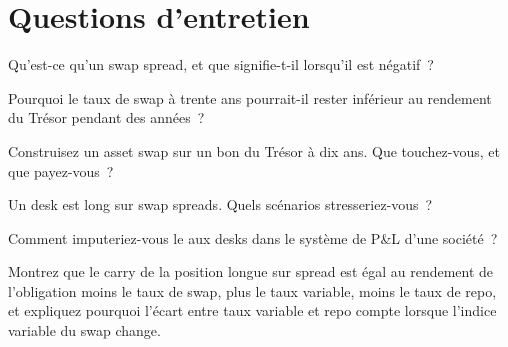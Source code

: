 \section{Questions d'entretien}

\begin{interviewq}\label{iq:s2:swap-spread-and-asset-swap-trades:1}
Qu'est-ce qu'un swap spread, et que signifie-t-il lorsqu'il est négatif~?
\end{interviewq}

\begin{interviewq}\label{iq:s2:swap-spread-and-asset-swap-trades:2}
Pourquoi le taux de swap à trente ans pourrait-il rester inférieur au rendement du Trésor pendant des années~?
\end{interviewq}

\begin{interviewq}\label{iq:s2:swap-spread-and-asset-swap-trades:3}
Construisez un asset swap sur un bon du Trésor à dix ans. Que touchez-vous, et que payez-vous~?
\end{interviewq}

\begin{interviewq}\label{iq:s2:swap-spread-and-asset-swap-trades:4}
Un desk est long sur swap spreads. Quels scénarios stresseriez-vous~?
\end{interviewq}

\begin{interviewq}\label{iq:s2:swap-spread-and-asset-swap-trades:5}
Comment imputeriez-vous le  aux desks dans le système de P\&L d'une société~?
\end{interviewq}

\begin{interviewq}\label{iq:s2:swap-spread-and-asset-swap-trades:6}
Montrez que le carry de la position longue sur spread est égal au rendement de l'obligation moins le taux de swap, plus le taux variable, moins le taux de repo,
et expliquez pourquoi l'écart entre taux variable et repo compte lorsque l'indice variable du swap change.
\end{interviewq}
